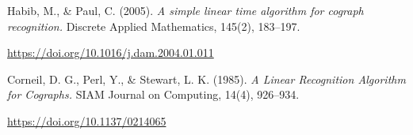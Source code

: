 
\begin{thebibliography}{99}

     Habib, M., \& Paul, C. (2005).
    \textit{A simple linear time algorithm for cograph recognition.}
    Discrete Applied Mathematics, 145(2), 183–197.

    \url{https://doi.org/10.1016/j.dam.2004.01.011}

     Corneil, D. G., Perl, Y., \& Stewart, L. K. (1985).
    \textit{A Linear Recognition Algorithm for Cographs.}
    SIAM Journal on Computing, 14(4), 926–934.

    \url{https://doi.org/10.1137/0214065}

\end{thebibliography}
